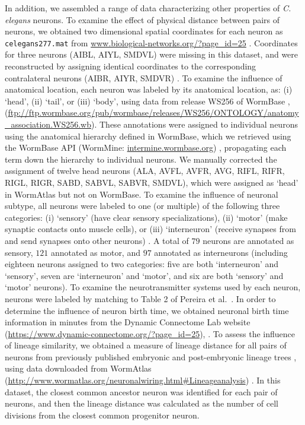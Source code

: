 In addition, we assembled a range of data characterizing other properties of \emph{C. elegans} neurons.
To examine the effect of physical distance between pairs of neurons, we obtained two dimensional spatial coordinates for each neuron as \texttt{celegans277.mat} from \url{www.biological-networks.org/?page_id=25} \citep{Choe2004}.
Coordinates for three neurons (AIBL, AIYL, SMDVL) were missing in this dataset, and were reconstructed by assigning identical coordinates to the corresponding contralateral neurons (AIBR, AIYR, SMDVR) \citep{Varier2011}.
To examine the influence of anatomical location, each neuron was labeled by its anatomical location, as:
(i) `head', (ii) `tail', or (iii) `body', using data from release WS256 of WormBase \citep{Harris2010}, (\url{ftp://ftp.wormbase.org/pub/wormbase/releases/WS256/ONTOLOGY/anatomy_association.WS256.wb}).
These annotations were assigned to individual neurons using the anatomical hierarchy defined in WormBase, which we retrieved using the WormBase API (WormMine: \url{intermine.wormbase.org}) \citep{Harris2010}, propagating each term down the hierarchy to individual neurons.
We manually corrected the assignment of twelve head neurons (ALA, AVFL, AVFR, AVG, RIFL, RIFR, RIGL, RIGR, SABD, SABVL, SABVR, SMDVL), which were assigned as `head' in WormAtlas \citep{WormAtlas} but not on WormBase.
To examine the influence of neuronal subtype, all neurons were labeled to one (or multiple) of the following three categories:
(i) `sensory' (have clear sensory specializations),
(ii) `motor' (make synaptic contacts onto muscle cells), or
(iii) `interneuron' (receive synapses from and send synapses onto other neurons) \citep{White1986}.
A total of $79$ neurons are annotated as sensory, $121$ annotated as motor, and $97$ annotated as interneurons (including eighteen neurons assigned to two categories: five are both `interneuron' and `sensory', seven are `interneuron' and `motor', and six are both `sensory' and `motor' neurons).
To examine the neurotransmitter systems used by each neuron, neurons were labeled by matching to Table 2 of Pereira et al.~\citep{Pereira2015}.
In order to determine the influence of neuron birth time, we obtained neuronal birth time information in minutes from the Dynamic Connectome Lab website (\url{https://www.dynamic-connectome.org/?page_id=25}), \citep{Varier2011}.
To assess the influence of lineage similarity, we obtained a measure of lineage distance for all pairs of neurons from previously published embryonic and post-embryonic lineage trees \citep{Sulston1977, Sulston1983}, using data downloaded from WormAtlas (\url{http://www.wormatlas.org/neuronalwiring.html#Lineageanalysis}) \citep{WormAtlas}.
In this dataset, the closest common ancestor neuron was identified for each pair of neurons, and then the lineage distance was calculated as the number of cell divisions from the closest common progenitor neuron.

